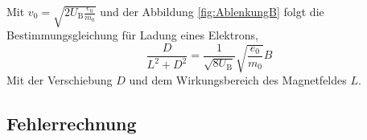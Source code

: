 Mit $v_0 = \sqrt{2 U_\text{B} \frac{e_0}{m_0}}$ und der Abbildung \eqref{fig:AblenkungB} folgt die Bestimmungsgleichung für Ladung eines Elektrons,
\begin{equation}
	\frac{D}{L^2 + D^2} = \frac{1}{\sqrt{8 U_\text{B}}} \sqrt{\frac{e_0}{m_0}} B
\end{equation}
Mit der Verschiebung $D$ und dem Wirkungsbereich des Magnetfeldes $L$.















\subsection{Fehlerrechnung}
